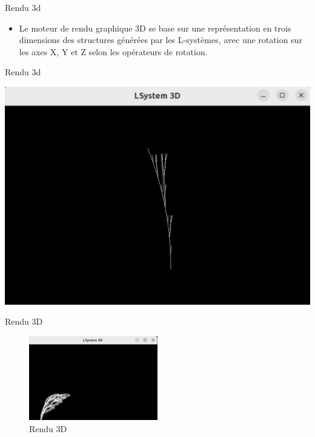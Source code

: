 \begin{frame}{Rendu 3d}
    \begin{itemize}
        \item  Le moteur de rendu graphique 3D se base sur une représentation en trois dimensions des structures générées par les L-systèmes, avec une rotation sur les axes X, Y et Z selon les opérateurs de rotation.
    \end{itemize}
\end{frame}
\begin{frame}{Rendu 3d}
    \begin{center}
        \includegraphics[scale=0.3]{./images/rv.png}
    \end{center}
\end{frame}

\begin{frame}{Rendu 3D}
    \begin{figure}[h!]
      \centering
      \includegraphics[width=0.5\textwidth]{images/rendu3d.png}
      \caption{Rendu 3D}
      \label{fig:3D}
    \end{figure}


\end{frame}

